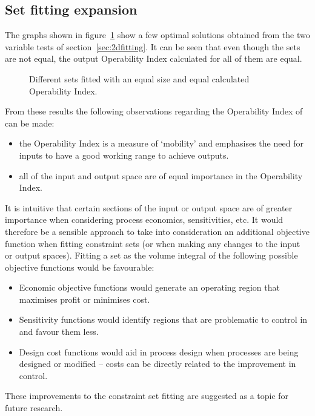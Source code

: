 \subsection{Set fitting expansion}\label{sec:setfitfuture}
The graphs shown in figure~\ref{fig:equaloifits} show a few optimal solutions obtained from the two variable tests of section~\ref{sec:2dfitting}.
It can be seen that even though the sets are not equal, the output Operability Index \citep{vinsonphd} calculated for all of them are equal.
\begin{figure}[htbp]
  \centering
    \scalebox{1}{}
    \scalebox{1}{}
  \caption[Equal size constraint set fits]{Different sets fitted with an equal size and equal calculated Operability Index.}
  \label{fig:equaloifits}
\end{figure}

From these results the following observations regarding the Operability Index of \citet{vinsonphd} can be made:
\begin{itemize}
\item the Operability Index is a measure of `mobility' and emphasises the need for inputs to have a good working range to achieve outputs.
\item all of the input and output space are of equal importance in the Operability Index.
\end{itemize}

It is intuitive that certain sections of the input or output space are of greater importance when considering process economics, sensitivities, etc.
It would therefore be a sensible approach to take into consideration an additional objective function when fitting constraint sets (or when making any changes to the input or output spaces).
Fitting a set as the volume integral of the following possible objective functions would be favourable:
\begin{itemize}
\item Economic objective functions would generate an operating region that maximises profit or minimises cost.
\item Sensitivity functions would identify regions that are problematic to control in and favour them less.
\item Design cost functions would aid in process design when processes are being designed or modified -- costs can be directly related to the improvement in control.
\end{itemize}
These improvements to the constraint set fitting are suggested as a topic for future research.

